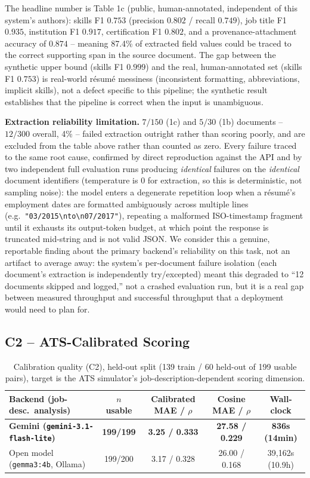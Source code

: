 \documentclass{article}
\begin{document}
The headline number is Table 1c (public, human-annotated, independent of this system's authors):
skills F1 $0.753$ (precision $0.802$ / recall $0.749$), job title F1 $0.935$, institution F1
$0.917$, certification F1 $0.802$, and a provenance-attachment accuracy of $0.874$ -- meaning 87.4\%
of extracted field values could be traced to the correct supporting span in the source document.
The gap between the synthetic upper bound (skills F1 $0.999$) and the real, human-annotated set
(skills F1 $0.753$) is real-world résumé messiness (inconsistent formatting, abbreviations,
implicit skills), not a defect specific to this pipeline; the synthetic result establishes that the
pipeline is correct when the input is unambiguous.

\textbf{Extraction reliability limitation.} $7/150$ (1c) and $5/30$ (1b) documents -- $12/300$
overall, 4\% -- failed extraction outright rather than scoring poorly, and are excluded from the
table above rather than counted as zero. Every failure traced to the same root cause, confirmed by
direct reproduction against the API and by two independent full evaluation runs producing
\emph{identical} failures on the \emph{identical} document identifiers (temperature is 0 for
extraction, so this is deterministic, not sampling noise): the model enters a degenerate
repetition loop when a résumé's employment dates are formatted ambiguously across multiple lines
(e.g.\ \texttt{"03/2015\textbackslash nto\textbackslash n07/2017"}), repeating a malformed
ISO-timestamp fragment until it exhausts its output-token budget, at which point the response is
truncated mid-string and is not valid JSON. We consider this a genuine, reportable finding about
the primary backend's reliability on this task, not an artifact to average away: the system's
per-document failure isolation (each document's extraction is independently try/excepted) meant
this degraded to ``12 documents skipped and logged,'' not a crashed evaluation run, but it is a real
gap between measured throughput and successful throughput that a deployment would need to plan for.

\subsection{C2 -- ATS-Calibrated Scoring}
\label{ssec:c2}

\begin{table}[h]
\centering
\caption{Calibration quality (C2), held-out split (139 train / 60 held-out of 199 usable pairs),
target is the ATS simulator's job-description-dependent scoring dimension.}
\label{tab:c2}
\begin{tabular}{lcccc}
\toprule
Backend (job-desc.\ analysis) & $n$ usable & Calibrated MAE / $\rho$ & Cosine MAE / $\rho$ & Wall-clock \\
\midrule
\textbf{Gemini (\texttt{gemini-3.1-flash-lite})} & \textbf{199/199} & \textbf{3.25 / 0.333} & \textbf{27.58 / 0.229} & \textbf{836s (14min)} \\
Open model (\texttt{gemma3:4b}, Ollama) & 199/200 & 3.17 / 0.328 & 26.00 / 0.168 & 39{,}162s (10.9h) \\
\bottomrule
\end{tabular}
\end{table}
\end{document}
